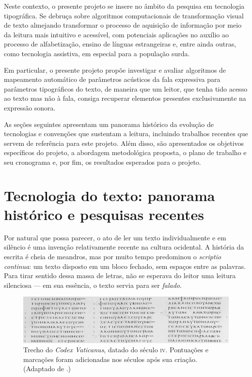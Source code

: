 \documentclass[a4paper,11pt,titlepage,singlespacing]{article}
\begin{document}
Neste contexto, o presente projeto se insere no âmbito da pesquisa em tecnologia tipográfica. Se debruça sobre algoritmos computacionais de transformação visual de texto almejando transformar o processo de aquisição de informação por meio da leitura mais intuitivo e acessível, com potenciais aplicações no auxílio ao processo de alfabetização, ensino de línguas estrangeiras e, entre ainda outras, como tecnologia assistiva, em especial para a população surda.


Em particular, o presente projeto propõe investigar e avaliar algoritmos de mapeamento automático de parâmetros acústicos da fala expressiva para parâmetros tipográficos do texto, de maneira que um leitor, que tenha tido acesso ao texto mas não à fala, consiga recuperar elementos presentes exclusivamente na expressão sonora.

As seções seguintes apresentam um panorama histórico da evolução de tecnologias e convenções que sustentam a leitura, incluindo trabalhos recentes que servem de referência para este projeto. Além disso, são apresentados os objetivos específicos do projeto, a abordagem metodológica proposta, o plano de trabalho e seu cronograma e, por fim, os resultados esperados para o projeto.

\section{Tecnologia do texto: panorama histórico e pesquisas recentes}
    
Por natural que possa parecer, o ato de ler um texto individualmente e em silêncio é uma invenção relativamente recente na cultura ocidental. A história da escrita é cheia de meandros, mas por muito tempo predominou o \textit{scriptio continua}: um texto disposto em um bloco fechado, sem espaços entre as palavras. Para tirar sentido dessa massa de letras, não se esperava do leitor uma leitura silenciosa — em sua essência, o texto servia para ser \textit{falado}.

    
\begin{figure}[!ht]    
    \centering
    \label{fig:codex_vaticanus}
    \captionsetup{width=\textwidth}
        \includegraphics[width=1\textwidth]{fig/codex_vaticanus-2.jpg}
        
    \caption{Trecho do \textit{Codex Vaticanus}, datado do século \textsc{iv}. Pontuações e marcações foram adicionadas nos séculos após sua criação. (Adaptado de \cite{codex_vaticanus}.)}
\end{figure}
\end{document}
